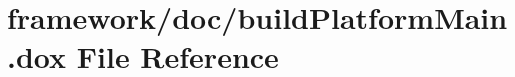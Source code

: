 \hypertarget{build_platform_main_8dox}{}\section{framework/doc/build\+Platform\+Main.dox File Reference}
\label{build_platform_main_8dox}
